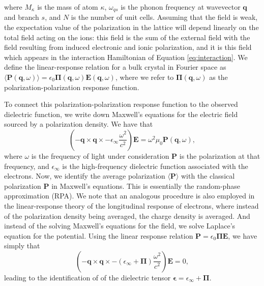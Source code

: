 \documentclass[aps,prb,twocolumn,
	groupedaddress,superscriptaddress,
	amsfonts,amssymb,amsmath,floatfix,
	citeautoscript]{revtex4-1}
\begin{document}
where $M_{\kappa}$ is the mass of atom $\kappa$, $\omega_{qs}$ is the phonon frequency at wavevector $\mathbf{q}$ and branch $s$, and $N$ is the number of unit cells. Assuming that the field is weak, the expectation value of the polarization in the lattice will depend linearly on the total field acting on the ions: this field is the sum of the external field with the field resulting from induced electronic and ionic polarization, and it is this field which appears in the interaction Hamiltonian of Equation \ref{eq:interaction}. We define the linear-response relation for a bulk crystal in Fourier space as $\langle\mathbf{P}(\mathbf{q},\omega)\rangle = \epsilon_0\boldsymbol{\Pi}(\mathbf{q},\omega)\mathbf{E}(\mathbf{q},\omega)$, where we refer to $\boldsymbol{\Pi}(\mathbf{q},\omega)$ as the polarization-polarization response function.

To connect this polarization-polarization response function to the observed dielectric function, we write down Maxwell's equations for the electric field sourced by a polarization density. We have that
\begin{equation}\label{eq:maxwellsourced}
\left(-\mathbf{q}\times\mathbf{q}\times - \epsilon_{\infty}\frac{\omega^2}{c^2} \right)\mathbf{E} = \omega^2\mu_0\mathbf{P}(\mathbf{q},\omega),
\end{equation}
where $\omega$ is the frequency of light under consideration $\mathbf{P}$ is the polarization at that frequency, and $\epsilon_{\infty}$ is the high-frequency dielectric function associated with the electrons. Now, we identify the average polarization $\langle\mathbf{P}\rangle$ with the classical polarization $\mathbf{P}$ in Maxwell's equations. This is essentially the random-phase approximation (RPA). We note that an analogous procedure is also employed in the linear-response theory of the longitudinal response of electrons, where instead of the polarization density being averaged, the charge density is averaged. And instead of the solving Maxwell's equations for the field, we solve Laplace's equation for the potential. Using the linear response relation $\mathbf{P} = \epsilon_0\boldsymbol{\Pi}\mathbf{E}$, we have simply that
\begin{equation}\label{eq:maxwellepsilon}
\left(-\mathbf{q}\times\mathbf{q}\times - \left(\epsilon_{\infty} + \boldsymbol{\Pi} \right)\frac{\omega^2}{c^2}\right)\mathbf{E} = 0,
\end{equation}
leading to the identification of of the dielectric tensor $\boldsymbol{\epsilon} = \epsilon_{\infty} + \boldsymbol{\Pi}$. 
\end{document}
